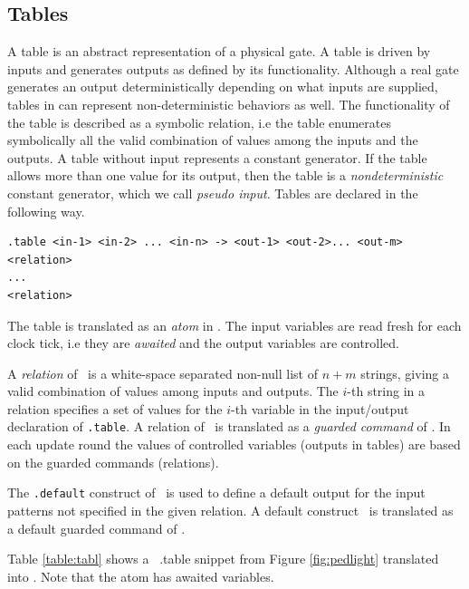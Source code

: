 \subsection{Tables}
A table is an abstract representation of a physical gate. A table
is driven by inputs and generates outputs as defined by its
functionality. Although a real gate generates an output
deterministically depending on what inputs are supplied, tables in
{\mv } can represent non-deterministic behaviors as well. The
functionality of the table is described as a symbolic relation,
i.e the table enumerates symbolically all the valid combination of
values among the inputs and the outputs. A table without input
represents a constant generator. If the table allows more than one
value for its output, then the table is a {\em nondeterministic}
constant generator, which we call {\em pseudo input}. Tables are
declared in the following way.

\begin{verbatim}
.table <in-1> <in-2> ... <in-n> -> <out-1> <out-2>... <out-m>
<relation>
...
<relation>
\end{verbatim}

The table is translated as an \emph{ atom }in {\rm }. The input
variables are read fresh for each clock tick, i.e they are
\emph{awaited} and the output variables are controlled.

 A {\em relation} of \mv \ is a white-space separated non-null list of
$n+m$ strings, giving a valid combination of values among inputs
and outputs. The $i$-th string in a relation specifies a set of
values for the $i$-th variable in the input/output declaration of
{\tt .table}. A relation of \mv \ is translated as a
\emph{guarded command} of {\rm }. In each update round the values
of controlled variables (outputs in tables) are based on the
guarded commands (relations).

The {\tt .default} construct of \mv \ is used to define a default
output for the input patterns not specified in the given relation.
A default construct \mv \ is translated as a default guarded
command of {\rm }.

Table \ref{table:tabl} shows a \mv \ .table snippet from Figure
\ref{fig:pedlight} translated into {\rm }. Note that the atom has
awaited variables.
%

